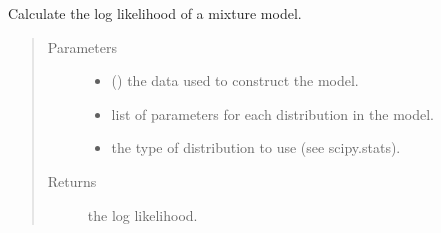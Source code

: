 \documentclass[letterpaper,10pt,english]{sphinxmanual}
\begin{document}
\begin{fulllineitems}
\label{\detokenize{tes:tes.analysis.mixture_model_ll}}
\sphinxAtStartPar
Calculate the log likelihood of a mixture model.
\begin{quote}\begin{description}
\item[{Parameters}] \leavevmode\begin{itemize}
\item {} 
\sphinxAtStartPar
{} () \textendash{} the data used to construct the model.

\item {} 
\sphinxAtStartPar
{} \textendash{} list of parameters for each distribution in the model.

\item {} 
\sphinxAtStartPar
{} \textendash{} the type of distribution to use (see scipy.stats).

\end{itemize}

\item[{Returns}] \leavevmode
\sphinxAtStartPar
the log likelihood.

\end{description}\end{quote}

\end{fulllineitems}

\end{document}
